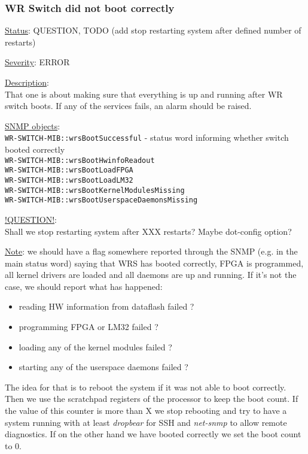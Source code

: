 \subsubsection{\bf WR Switch did not boot correctly}
		\label{fail:other:boot}
		\begin{packed_enum}
			\item [] \underline{Status}: QUESTION, TODO (add stop restarting system after defined number of restarts)
			\item [] \underline{Severity}: ERROR
			\item [] \underline{Description}:\\
				That one is about making sure that everything is up and running after WR
				switch boots. If any of the services fails, an alarm should be raised.
			\item [] \underline{SNMP objects}:\\
				\texttt{WR-SWITCH-MIB::wrsBootSuccessful} - status word informing whether switch booted correctly\\
				\texttt{WR-SWITCH-MIB::wrsBootHwinfoReadout}\\
				\texttt{WR-SWITCH-MIB::wrsBootLoadFPGA}\\
				\texttt{WR-SWITCH-MIB::wrsBootLoadLM32}\\
				\texttt{WR-SWITCH-MIB::wrsBootKernelModulesMissing}\\
				\texttt{WR-SWITCH-MIB::wrsBootUserspaceDaemonsMissing}
			\item [] \underline{!QUESTION!}: \\
				Shall we stop restarting system after XXX restarts? Maybe dot-config option?
			\item [] \underline{Note}: we should have a flag somewhere reported
				through the SNMP (e.g. in the main status word) saying that WRS has
				booted correctly, FPGA is programmed, all kernel drivers are loaded and
				all daemons are up and running. If it's not the case, we should report
				what has happened:
				\begin{itemize}
					\item reading HW information from dataflash failed ?
					\item programming FPGA or LM32 failed ?
					\item loading any of the kernel modules failed ?
					\item starting any of the userspace daemons failed ?
				\end{itemize}
				The idea for that is to reboot the system if it was not able to boot
				correctly. Then we use the scratchpad registers of the processor to keep
				the boot count. If the value of this counter is more than X we stop
				rebooting and try to have a system running with at least \emph{dropbear}
				for SSH and \emph{net-snmp} to allow remote diagnostics. If on the other
				hand we have booted correctly we set the boot count to 0.
		\end{packed_enum}

